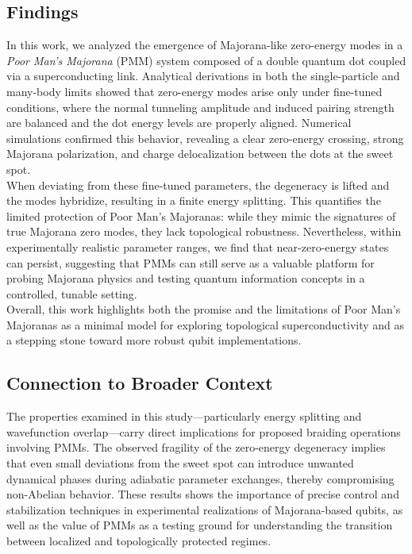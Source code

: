 \documentclass[11pt, letterpaper, titlepage]{article}
\begin{document}
\subsection{Findings}
In this work, we analyzed the emergence of Majorana-like zero-energy modes in a \textit{Poor Man’s Majorana} (PMM) system composed of a double quantum dot coupled via a superconducting link. Analytical derivations in both the single-particle and many-body limits showed that zero-energy modes arise only under fine-tuned conditions, where the normal tunneling amplitude and induced pairing strength are balanced and the dot energy levels are properly aligned. Numerical simulations confirmed this behavior, revealing a clear zero-energy crossing, strong Majorana polarization, and charge delocalization between the dots at the sweet spot. \\
When deviating from these fine-tuned parameters, the degeneracy is lifted and the modes hybridize, resulting in a finite energy splitting. This quantifies the limited protection of Poor Man’s Majoranas: while they mimic the signatures of true Majorana zero modes, they lack topological robustness. Nevertheless, within experimentally realistic parameter ranges, we find that near-zero-energy states can persist, suggesting that PMMs can still serve as a valuable platform for probing Majorana physics and testing quantum information concepts in a controlled, tunable setting. \\
Overall, this work highlights both the promise and the limitations of Poor Man’s Majoranas as a minimal model for exploring topological superconductivity and as a stepping stone toward more robust qubit implementations.

\subsection{Connection to Broader Context}
The properties examined in this study—particularly energy splitting and wavefunction overlap—carry direct implications for proposed braiding operations involving PMMs. The observed fragility of the zero-energy degeneracy implies that even small deviations from the sweet spot can introduce unwanted dynamical phases during adiabatic parameter exchanges, thereby compromising non-Abelian behavior. These results shows the importance of precise control and stabilization techniques in experimental realizations of Majorana-based qubits, as well as the value of PMMs as a testing ground for understanding the transition between localized and topologically protected regimes.
\end{document}
